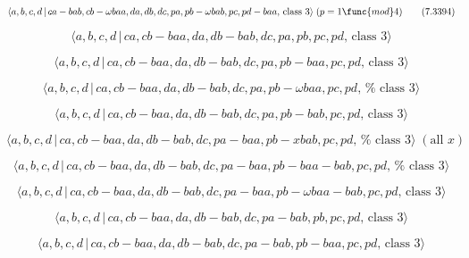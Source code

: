\documentclass[10pt]{article}
\begin{document}
\begin{equation}
\langle a,b,c,d\,|\,ca-bab,cb-\omega baa,da,db,dc,pa,pb-\omega
bab,pc,pd-baa,\,\text{class }3\rangle \;(p=1\func{mod}4)  \tag{7.3394}
\end{equation}

\begin{equation}
\langle a,b,c,d\,|\,ca,cb-baa,da,db-bab,dc,pa,pb,pc,pd,\,\text{class }%
3\rangle  \tag{7.3395}
\end{equation}

\begin{equation}
\langle a,b,c,d\,|\,ca,cb-baa,da,db-bab,dc,pa,pb-baa,pc,pd,\,\text{class }%
3\rangle  \tag{7.3396}
\end{equation}

\begin{equation}
\langle a,b,c,d\,|\,ca,cb-baa,da,db-bab,dc,pa,pb-\omega baa,pc,pd,\,\text{%
class }3\rangle  \tag{7.3397}
\end{equation}

\begin{equation}
\langle a,b,c,d\,|\,ca,cb-baa,da,db-bab,dc,pa,pb-bab,pc,pd,\,\text{class }%
3\rangle  \tag{7.3398}
\end{equation}

\begin{equation}
\langle a,b,c,d\,|\,ca,cb-baa,da,db-bab,dc,pa-baa,pb-xbab,pc,pd,\,\text{%
class }3\rangle \;(\text{all }x)  \tag{7.3399}
\end{equation}

\begin{equation}
\langle a,b,c,d\,|\,ca,cb-baa,da,db-bab,dc,pa-baa,pb-baa-bab,pc,pd,\,\text{%
class }3\rangle  \tag{7.3400}
\end{equation}

\begin{equation}
\langle a,b,c,d\,|\,ca,cb-baa,da,db-bab,dc,pa-baa,pb-\omega baa-bab,pc,pd,\,%
\text{class }3\rangle  \tag{7.3401}
\end{equation}

\begin{equation}
\langle a,b,c,d\,|\,ca,cb-baa,da,db-bab,dc,pa-bab,pb,pc,pd,\,\text{class }%
3\rangle  \tag{7.3402}
\end{equation}

\begin{equation}
\langle a,b,c,d\,|\,ca,cb-baa,da,db-bab,dc,pa-bab,pb-baa,pc,pd,\,\text{class 
}3\rangle  \tag{7.3403}
\end{equation}
\end{document}
